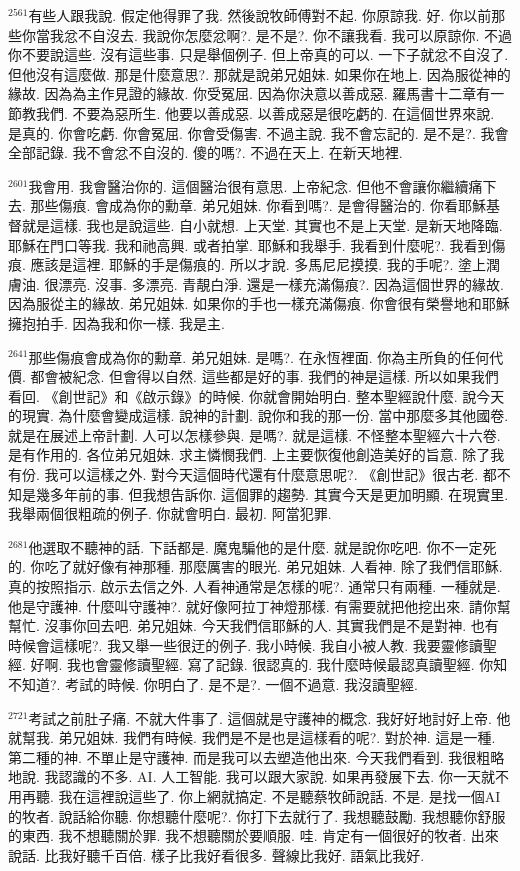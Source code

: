 \documentclass{book}
\begin{document}
$^{2561}$有些人跟我說.
假定他得罪了我.
然後說牧師傅對不起.
你原諒我.
好.
你以前那些你當我忿不自沒去.
我說你怎麼忿啊?.
是不是?.
你不讓我看.
我可以原諒你.
不過你不要說這些.
沒有這些事.
只是舉個例子.
但上帝真的可以.
一下子就忿不自沒了.
但他沒有這麼做.
那是什麼意思?.
那就是說弟兄姐妹.
如果你在地上.
因為服從神的緣故.
因為為主作見證的緣故.
你受冤屈.
因為你決意以善成惡.
羅馬書十二章有一節教我們.
不要為惡所生.
他要以善成惡.
以善成惡是很吃虧的.
在這個世界來說.
是真的.
你會吃虧.
你會冤屈.
你會受傷害.
不過主說.
我不會忘記的.
是不是?.
我會全部記錄.
我不會忿不自沒的.
傻的嗎?.
不過在天上.
在新天地裡.

$^{2601}$我會用.
我會醫治你的.
這個醫治很有意思.
上帝紀念.
但他不會讓你繼續痛下去.
那些傷痕.
會成為你的勳章.
弟兄姐妹.
你看到嗎?.
是會得醫治的.
你看耶穌基督就是這樣.
我也是說這些.
自小就想.
上天堂.
其實也不是上天堂.
是新天地降臨.
耶穌在門口等我.
我和祂高興.
或者拍掌.
耶穌和我舉手.
我看到什麼呢?.
我看到傷痕.
應該是這裡.
耶穌的手是傷痕的.
所以才說.
多馬尼尼摸摸.
我的手呢?.
塗上潤膚油.
很漂亮.
沒事.
多漂亮.
青靚白淨.
還是一樣充滿傷痕?.
因為這個世界的緣故.
因為服從主的緣故.
弟兄姐妹.
如果你的手也一樣充滿傷痕.
你會很有榮譽地和耶穌擁抱拍手.
因為我和你一樣.
我是主.

$^{2641}$那些傷痕會成為你的勳章.
弟兄姐妹.
是嗎?.
在永恆裡面.
你為主所負的任何代價.
都會被紀念.
但會得以自然.
這些都是好的事.
我們的神是這樣.
所以如果我們看回.
《創世記》和《啟示錄》的時候.
你就會開始明白.
整本聖經說什麼.
說今天的現實.
為什麼會變成這樣.
說神的計劃.
說你和我的那一份.
當中那麼多其他國卷.
就是在展述上帝計劃.
人可以怎樣參與.
是嗎?.
就是這樣.
不怪整本聖經六十六卷.
是有作用的.
各位弟兄姐妹.
求主憐憫我們.
上主要恢復他創造美好的旨意.
除了我有份.
我可以這樣之外.
對今天這個時代還有什麼意思呢?.
《創世記》很古老.
都不知是幾多年前的事.
但我想告訴你.
這個罪的趨勢.
其實今天是更加明顯.
在現實里.
我舉兩個很粗疏的例子.
你就會明白.
最初.
阿當犯罪.

$^{2681}$他選取不聽神的話.
下話都是.
魔鬼騙他的是什麼.
就是說你吃吧.
你不一定死的.
你吃了就好像有神那種.
那麼厲害的眼光.
弟兄姐妹.
人看神.
除了我們信耶穌.
真的按照指示.
啟示去信之外.
人看神通常是怎樣的呢?.
通常只有兩種.
一種就是.
他是守護神.
什麼叫守護神?.
就好像阿拉丁神燈那樣.
有需要就把他挖出來.
請你幫幫忙.
沒事你回去吧.
弟兄姐妹.
今天我們信耶穌的人.
其實我們是不是對神.
也有時候會這樣呢?.
我又舉一些很迂的例子.
我小時候.
我自小被人教.
我要靈修讀聖經.
好啊.
我也會靈修讀聖經.
寫了記錄.
很認真的.
我什麼時候最認真讀聖經.
你知不知道?.
考試的時候.
你明白了.
是不是?.
一個不過意.
我沒讀聖經.

$^{2721}$考試之前肚子痛.
不就大件事了.
這個就是守護神的概念.
我好好地討好上帝.
他就幫我.
弟兄姐妹.
我們有時候.
我們是不是也是這樣看的呢?.
對於神.
這是一種.
第二種的神.
不單止是守護神.
而是我可以去塑造他出來.
今天我們看到.
我很粗略地說.
我認識的不多.
AI.
人工智能.
我可以跟大家說.
如果再發展下去.
你一天就不用再聽.
我在這裡說這些了.
你上網就搞定.
不是聽蔡牧師說話.
不是.
是找一個AI的牧者.
說話給你聽.
你想聽什麼呢?.
你打下去就行了.
我想聽鼓勵.
我想聽你舒服的東西.
我不想聽關於罪.
我不想聽關於要順服.
哇.
肯定有一個很好的牧者.
出來說話.
比我好聽千百倍.
樣子比我好看很多.
聲線比我好.
語氣比我好.
\end{document}
